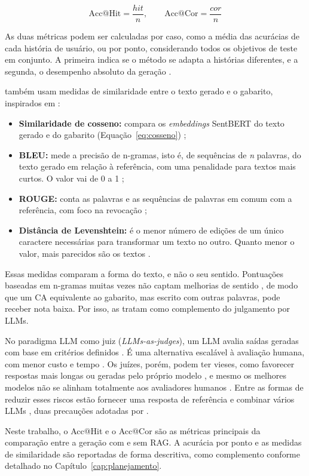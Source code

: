 \begin{equation}
  \mathrm{Acc@Hit} = \frac{\mathit{hit}}{n}, \qquad \mathrm{Acc@Cor} = \frac{\mathit{cor}}{n}
\end{equation}

As duas métricas podem ser calculadas por caso, como a média das acurácias de cada história de usuário, ou por ponto, considerando todos os objetivos de teste em conjunto. A primeira indica se o método se adapta a histórias diferentes, e a segunda, o desempenho absoluto da geração \cite[p.~3341]{wang2025}.

 também usam medidas de similaridade entre o texto gerado e o gabarito, inspirados em :

\begin{itemize}
  \item \textbf{Similaridade de cosseno:} compara os \textit{embeddings} SentBERT do texto gerado e do gabarito (Equação~\ref{eq:cosseno}) \cite[p.~3341]{wang2025};
  \item \textbf{BLEU:} mede a precisão de n-gramas, isto é, de sequências de \textit{n} palavras, do texto gerado em relação à referência, com uma penalidade para textos mais curtos. O valor vai de 0 a 1 \cite[p.~312, 315]{papineni2002};
  \item \textbf{ROUGE:} conta as palavras e as sequências de palavras em comum com a referência, com foco na revocação \cite[p.~247]{arora2024};
  \item \textbf{Distância de Levenshtein:} é o menor número de edições de um único caractere necessárias para transformar um texto no outro. Quanto menor o valor, mais parecidos são os textos \cite[p.~3341]{wang2025}.
\end{itemize}

Essas medidas comparam a forma do texto, e não o seu sentido. Pontuações baseadas em n-gramas muitas vezes não captam melhorias de sentido \cite[p.~3343]{wang2025}, de modo que um CA equivalente ao gabarito, mas escrito com outras palavras, pode receber nota baixa. Por isso,  as tratam como complemento do julgamento por LLMs.

No paradigma LLM como juiz (\textit{LLMs-as-judges}), um LLM avalia saídas geradas com base em critérios definidos \cite[p.~3]{li2024judges}. É uma alternativa escalável à avaliação humana, com menor custo e tempo \cite[p.~2]{li2024judges}. Os juízes, porém, podem ter vieses, como favorecer respostas mais longas ou geradas pelo próprio modelo \cite[p.~37]{li2024judges}, e mesmo os melhores modelos não se alinham totalmente aos avaliadores humanos \cite[p.~404--405]{thakur2025}. Entre as formas de reduzir esses riscos estão fornecer uma resposta de referência e combinar vários LLMs \cite[p.~41]{li2024judges}, duas precauções adotadas por .

Neste trabalho, o Acc@Hit e o Acc@Cor  são as métricas principais da comparação entre a geração com e sem RAG. A acurácia por ponto e as medidas de similaridade são reportadas de forma descritiva, como complemento conforme detalhado no Capítulo~\ref{cap:planejamento}.
